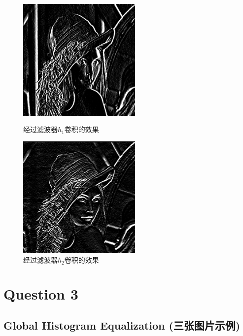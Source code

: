 \documentclass[a4paper,UTF8]{article}
\numberwithin{equation}{section}
\begin{document}
\begin{figure}[htbp]
\centering
\begin{minipage}[t]{0.48\textwidth}
\centering
\includegraphics[width=6cm]{Lenna_filter.png}
\caption{经过滤波器$h_1$卷积的效果}
\end{minipage}
\begin{minipage}[t]{0.48\textwidth}
\centering
\includegraphics[width=6cm]{Lenna_filter_v.png}
\caption{经过滤波器$h_2$卷积的效果}
\end{minipage}
\end{figure}

























\section{Question 3}
\subsection{Global Histogram Equalization (三张图片示例)}
\end{document}
